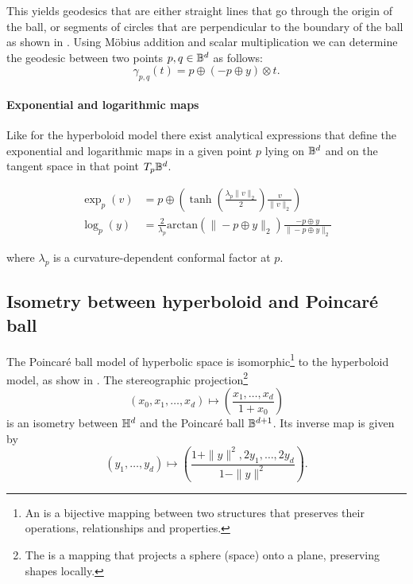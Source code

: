 This yields geodesics that are either straight lines that go through the origin of the ball, or segments of circles that are perpendicular to the boundary of the ball as shown in . Using Möbius addition and scalar multiplication we can determine the geodesic between two points $p,q\in\mathbb{B}^d$ as follows:
\begin{equation*}
    \gamma_{p,q}(t) = p\oplus (-p \oplus y) \otimes t.
\end{equation*}

\paragraph{Exponential and logarithmic maps}
Like for the hyperboloid model there exist analytical expressions that define the exponential and logarithmic maps in a given point $p$ lying on $\mathbb{B}^d$ and on the tangent space in that point $T_p\mathbb{B}^d$. 

\begin{align*}
    \exp_p(v) &= p \oplus \left(\tanh\left(\frac{\lambda_p\|v\|_2}{2}\right)\frac{v}{\|v\|_2}\right) \\
    \log_p(y) &= \frac{2}{\lambda_p}\text{arctan}(\|-p \oplus y\|_2)\frac{-p \oplus y}{\|-p \oplus y\|_2}
\end{align*}

where $\lambda_p$ is a curvature-dependent conformal factor at $p$.



\subsection{Isometry between hyperboloid and Poincaré ball}\label{sec:isometry}
The Poincaré ball model of hyperbolic space is isomorphic\footnote{An  is a bijective mapping between two structures that preserves their operations, relationships and properties.} to the hyperboloid model, as show in . The stereographic projection\footnote{The  is a mapping that projects a sphere (space) onto a plane, preserving shapes locally.}
\begin{equation}\label{eq:stereographicProjection}
    (x_0, x_1, \ldots, x_d) \mapsto \left(\frac{x_1, \ldots, {x_d}}{1+x_0}\right)
\end{equation}
is an isometry between $\mathbb{H}^{d}$ and the Poincaré ball $\mathbb{B}^{d+1}$. Its inverse map is given by
\begin{equation}\label{eq:inverseStereographicProjection}
    (y_1, \ldots, y_d) \mapsto \left(\frac{1 + \|y\|^2, 2y_1, \ldots, 2y_d}{1 - \|y\|^2}\right).
\end{equation}

